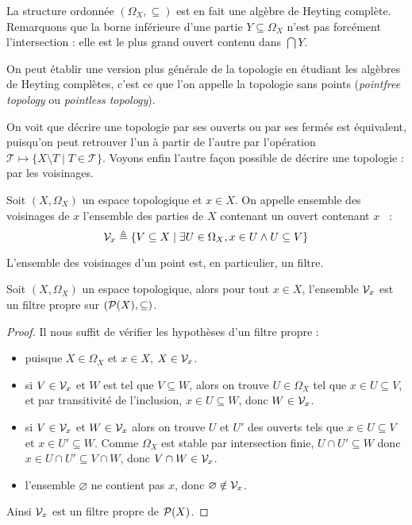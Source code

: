 \begin{remark}
  La structure ordonnée $(\Omega_X,\subseteq)$ est en fait une algèbre de
  Heyting complète. Remarquons que la borne inférieure d'une partie
  $Y\subseteq\Omega_X$ n'est pas forcément l'intersection : elle est le plus
  grand ouvert contenu dans $\bigcap Y$.

  On peut établir une version plus générale de la topologie en étudiant les
  algèbres de Heyting complètes, c'est ce que l'on appelle la topologie sans
  points (\textit{pointfree topology} ou \textit{pointless topology}).
\end{remark}

On voit que décrire une topologie par ses ouverts ou par ses fermés est
équivalent, puisqu'on peut retrouver l'un à partir de l'autre par l'opération
$\mathcal T \mapsto \{X\setminus T \mid T \in \mathcal T\}$. Voyons enfin
l'autre façon possible de décrire une topologie : par les voisinages.

\begin{definition}[Voisinage]
  Soit $(X,\Omega_X)$ un espace topologique et $x\in X$. On appelle ensemble des
  voisinages de $x$ l'ensemble des parties de $X$ contenant un ouvert contenant
  $x$~ :
  \[\mathcal{V}_x \triangleq \{V \subseteq X \mid \exists U \in \Omega_X, x\in U \land
  U\subseteq V\}\]
\end{definition}

L'ensemble des voisinages d'un point est, en particulier, un filtre.

\begin{property}
  Soit $(X,\Omega_X)$ un espace topologique, alors pour tout $x\in X$,
  l'ensemble $\mathcal{V}_x$ est un filtre propre sur $(\mathcal{P}(X),\subseteq)$.
\end{property}

\begin{proof}
  Il nous suffit de vérifier les hypothèses d'un filtre propre :
  \begin{itemize}
  \item puisque $X\in\Omega_X$ et $x\in X$, $X\in \mathcal{V}_x$.
  \item si $V\in \mathcal{V}_x$ et $W$ est tel que $V\subseteq W$, alors on trouve
    $U\in \Omega_X$ tel que $x\in U \subseteq V$, et par transitivité de
    l'inclusion, $x\in U \subseteq W$, donc $W\in \mathcal{V}_x$.
  \item si $V\in \mathcal{V}_x$ et $W\in \mathcal{V}_x$ alors on trouve $U$ et $U'$ des
    ouverts tels que $x\in U \subseteq V$ et $x\in U' \subseteq W$. Comme
    $\Omega_X$ est stable par intersection finie, $U\cap U' \subseteq W$ donc
    $x\in U\cap U' \subseteq V\cap W$, donc $V\cap W \in \mathcal{V}_x$.
  \item l'ensemble $\varnothing$ ne contient pas $x$, donc
    $\varnothing\notin\mathcal{V}_x$.
  \end{itemize}

  Ainsi $\mathcal{V}_x$ est un filtre propre de $\mathcal{P}(X)$.
\end{proof}


